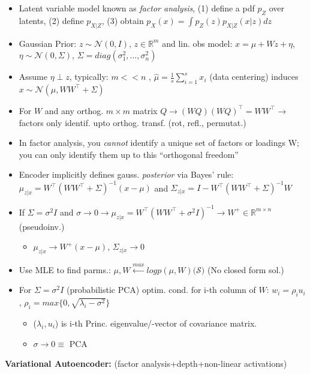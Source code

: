 \begin{itemize}
    \item Latent variable model known as \textit{factor analysis}, (1) define a pdf \(p_Z \) over latents, (2) define \(p_{X|Z}\), (3) obtain \(p_X(x) = \int p_Z(z)p_{X|Z}(x|z)dz\)
    \item Gaussian Prior: \(z\sim \mathcal{N}(0,I)\), \(z\in \mathbb{R}^m\) and lin. obs model: \(x = \mu + Wz+ \eta\), \(\eta \sim \mathcal{N}(0,\Sigma)\), \(\Sigma= diag(\sigma_1^2, \dots,\sigma_n^2)\) 
    \item Assume \(\eta \perp z\), typically: \(m<<n\) , \(\hat{\mu}= \frac{1}{s}\sum_{i=1}^sx_i\) (data centering) induces \(x\sim \mathcal{N}(\mu,WW^\top+\Sigma)\)
    \item For  \(W\) and any orthog. \(m\times m\) matrix \(Q\rightarrow (WQ)(WQ)^\top=WW^\top \rightarrow\) factors only identif. upto orthog. transf. (rot, refl., permutat.) 
    \item \textrightarrow In factor analysis, you \textit{cannot} identify a unique set of factors or loadings W; you can only identify them up to this “orthogonal freedom” 
    \item Encoder implicitly defines gauss. \textit{posterior} via Bayes' rule: \(\mu_{z|x}=W^\top(WW^\top+\Sigma)^{-1}(x-\mu)\) and \(\Sigma_{z|x}= I -W^\top(WW^\top +\Sigma)^{-1}W\)
    \item If \(\Sigma =\sigma^2I\) and \(\sigma\rightarrow 0 \rightarrow\)\(\mu_{z|x}=W^\top(WW^\top+\sigma^2I)^{-1}\rightarrow W^+\in \mathbb{R}^{m\times n}\) (pseudoinv.)
    \begin{itemize}
        \item \(\mu_{z|x}\rightarrow W^+(x-\mu)\), \(\Sigma_{z|x}\rightarrow 0\)
    \end{itemize}
    \item Use MLE to find parms.: \(\mu,W \overset{max}{\leftarrow}logp(\mu,W)(\mathcal{S)}\) (No closed form sol.)
    \item For \(\Sigma=\sigma^2I\) (probabilistic PCA) optim. cond. for i-th column of \(W\): \(w_i = \rho_iu_i\), \(\rho_i = max\{0,\sqrt{\lambda_i-\sigma^2}\}\)
    \begin{itemize}
        \item (\(\lambda_i,u_i\)) is i-th Princ. eigenvalue/-vector of covariance matrix.
        \item \(\sigma \rightarrow 0\equiv \) PCA
    \end{itemize}
\end{itemize}
\textbf{Variational Autoencoder:} (factor analysis+depth+non-linear activations)
